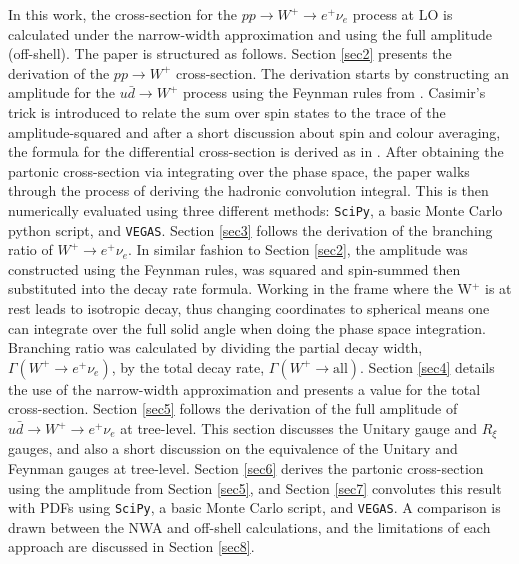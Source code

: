 \documentclass[a4paper,11pt]{article}
\begin{document}
In this work, the cross-section for the $pp\rightarrow W^+ \rightarrow e^+ \nu_e$ process at LO is calculated under the narrow-width approximation and using the full amplitude (off-shell). The paper is structured as follows. Section \ref{sec2} presents the derivation of the $pp \rightarrow W^+$ cross-section. The derivation starts by constructing an amplitude for the $u\bar{d} \rightarrow W^+$ process using the Feynman rules from \cite{Barger:2019ydb}. Casimir's trick is introduced to relate the sum over spin states to the trace of the amplitude-squared and after a short discussion about spin and colour averaging, the formula for the differential cross-section is derived as in \cite{Peskin:1995ev}. After obtaining the partonic cross-section via integrating over the phase space, the paper walks through the process of deriving the hadronic convolution integral. This is then numerically evaluated using three different methods: \texttt{SciPy}, a basic Monte Carlo python script, and \texttt{VEGAS}. Section \ref{sec3} follows the derivation of the branching ratio of $W^+ \rightarrow e^+\nu_e$. In similar fashion to Section \ref{sec2}, the amplitude was constructed using the Feynman rules, was squared and spin-summed then substituted into the decay rate formula. Working in the frame where the W$^+$ is at rest leads to isotropic decay, thus changing coordinates to spherical means one can integrate over the full solid angle when doing the phase space integration. Branching ratio was calculated by dividing the partial decay width, $\Gamma (W^+ \rightarrow e^+ \nu_e)$, by the total decay rate, $\Gamma (W^+ \rightarrow \text{all})$. Section \ref{sec4} details the use of the narrow-width approximation and presents a value for the total cross-section. Section \ref{sec5} follows the derivation of the full amplitude of $u \bar{d} \rightarrow W^+ \rightarrow e^+ \nu_e$ at tree-level. This section discusses the Unitary gauge and $R_{\xi}$ gauges, and also a short discussion on the equivalence of the Unitary and Feynman gauges at tree-level. Section \ref{sec6} derives the partonic cross-section using the amplitude from Section \ref{sec5}, and Section \ref{sec7} convolutes this result with PDFs using \texttt{SciPy}, a basic Monte Carlo script, and \texttt{VEGAS}. A comparison is drawn between the NWA and off-shell calculations, and the limitations of each approach are discussed in Section \ref{sec8}.


\end{document}
